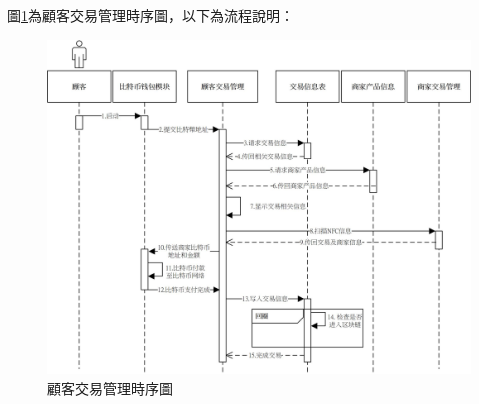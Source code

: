 	

	圖\ref{time5}為顧客交易管理時序圖，以下為流程說明：

	\begin{figure}[htbp]
		\centering
		\includegraphics[width = 1\textwidth]{time5.jpg}
		\caption{顧客交易管理時序圖}\label{time5}
	\end{figure}

